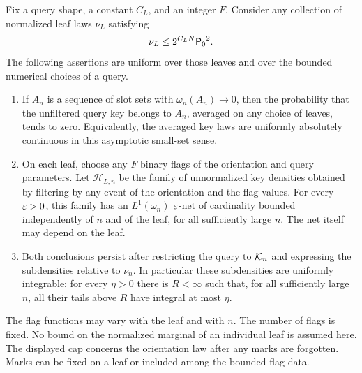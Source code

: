 \begin{lemma}\label{lem:histogram-control}
Fix a query shape, a constant $C_L$, and an integer $F$. Consider any
collection of normalized leaf laws $\nu_L$ satisfying
\begin{equation}\label{eq:histogram-leaf-cap}
 \nu_L\le 2^{C_LN}{\mathsf P_0}^2.
\end{equation}
The following assertions are uniform over those leaves and over the
bounded numerical choices of a query.
\begin{enumerate}[label=(\roman*)]
\item If $A_n$ is a sequence of slot sets with
$\omega_n(A_n)\to0$, then the probability that the unfiltered query
key belongs to $A_n$, averaged on any choice of leaves, tends to zero.
Equivalently, the averaged key laws are uniformly absolutely continuous
in this asymptotic small-set sense.
\item On each leaf, choose any $F$ binary flags of the orientation and
query parameters. Let $\mathcal H_{L,n}$ be the family of
unnormalized key densities obtained by filtering by any event of the
orientation and the flag values. For every $\varepsilon>0$, this family has an
$L^1(\omega_n)$ $\varepsilon$-net of cardinality bounded independently of $n$
and of the leaf, for all sufficiently large $n$. The net itself may
depend on the leaf.
\item Both conclusions persist after restricting the query to $\mathcal K_n$
and expressing the subdensities relative to $\nu_n$. In particular these
subdensities are uniformly integrable: for every $\eta>0$ there is
$R<\infty$ such that, for all sufficiently large $n$, all their tails
above $R$ have integral at most $\eta$.
\end{enumerate}
The flag functions may vary with the leaf and with $n$. The number of
flags is fixed. No bound on the normalized marginal of an individual
leaf is assumed here.
The displayed cap concerns the orientation law after any marks are
forgotten.  Marks can be fixed on a leaf or included among the
bounded flag data.
\end{lemma}

